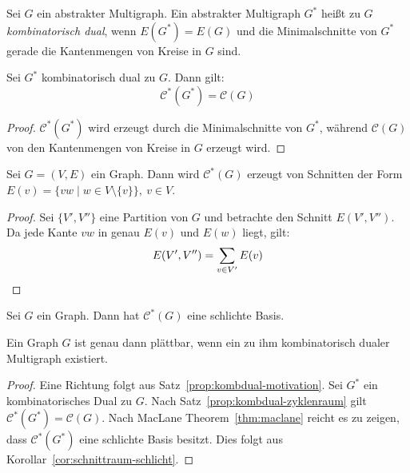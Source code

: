 \documentclass[10pt,b5paper]{article}
\begin{document}
\begin{definition}
Sei $G$ ein abstrakter Multigraph. Ein abstrakter Multigraph $G^\ast$ heißt zu $G$ \textit{kombinatorisch dual}, wenn $E(G^\ast) = E(G)$ und die Minimalschnitte von $G^\ast$ gerade die Kantenmengen von Kreise in $G$ sind.
\end{definition}

\begin{proposition}\label{prop:kombdual-zyklenraum}
Sei $G^\ast$ kombinatorisch dual zu $G$. Dann gilt:
\[ \mathcal{C}^\ast(G^\ast) =\mathcal{C}(G) \]
\end{proposition}

\begin{proof}
$\mathcal{C}^\ast(G^\ast)$ wird erzeugt durch die Minimalschnitte von $G^\ast$, während $\mathcal{C}(G)$ von den Kantenmengen von Kreise in $G$ erzeugt wird.
\end{proof}

\begin{lemma}\label{lem:schnittraum-schlicht}
Sei $G=(V, E)$ ein Graph. Dann wird $\mathcal{C}^\ast(G)$ erzeugt von Schnitten der Form $E(v) = \{vw\mid w\in V\setminus\{v\} \},\ v\in V$.
\end{lemma}

\begin{proof}
Sei $\{V', V''\}$ eine Partition von $G$ und betrachte den Schnitt $E(V', V'')$. Da jede Kante $vw$ in genau $E(v)$ und $E(w)$ liegt, gilt:
\[ E(V', V'') = \sum_{v\in V'} E(v) \qedhere \]
\end{proof}

\begin{corollary}\label{cor:schnittraum-schlicht}
Sei $G$ ein Graph. Dann hat $\mathcal{C}^\ast(G)$ eine schlichte Basis.
\end{corollary}

\begin{theorem}
Ein Graph $G$ ist genau dann plättbar, wenn ein zu ihm kombinatorisch dualer Multigraph existiert.
\end{theorem}

\begin{proof}
Eine Richtung folgt aus Satz~\ref{prop:kombdual-motivation}. Sei $G^\ast$ ein kombinatorisches Dual zu $G$. Nach Satz~\ref{prop:kombdual-zyklenraum} gilt $\mathcal{C}^\ast(G^\ast) =\mathcal{C}(G)$. Nach MacLane Theorem~\ref{thm:maclane} reicht es zu zeigen, dass $\mathcal{C}^\ast(G^\ast)$ eine schlichte Basis besitzt. Dies folgt aus Korollar~\ref{cor:schnittraum-schlicht}.
\end{proof}
\end{document}
